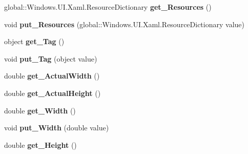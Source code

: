 \begin{DoxyCompactItemize}
global\+::\+Windows.\+U\+I.\+Xaml.\+Resource\+Dictionary {\bfseries get\+\_\+\+Resources} ()
\item 
\mbox{\label{interface_windows_1_1_u_i_1_1_xaml_1_1_i_framework_element_ac37b49cdd76f27a64fdecca76f291b5d}} 
void {\bfseries put\+\_\+\+Resources} (global\+::\+Windows.\+U\+I.\+Xaml.\+Resource\+Dictionary value)
\item 
\mbox{\label{interface_windows_1_1_u_i_1_1_xaml_1_1_i_framework_element_a468d4d76ade5b5e14eccf702af30bbf9}} 
object {\bfseries get\+\_\+\+Tag} ()
\item 
\mbox{\label{interface_windows_1_1_u_i_1_1_xaml_1_1_i_framework_element_a946ec4333d28b5f8c9cca42ce9f9eebc}} 
void {\bfseries put\+\_\+\+Tag} (object value)
\item 
\mbox{\label{interface_windows_1_1_u_i_1_1_xaml_1_1_i_framework_element_a19ecd72cbe177cde31aa3674f563854a}} 
double {\bfseries get\+\_\+\+Actual\+Width} ()
\item 
\mbox{\label{interface_windows_1_1_u_i_1_1_xaml_1_1_i_framework_element_a4501c5030b9e56f51a374091a2fa69f0}} 
double {\bfseries get\+\_\+\+Actual\+Height} ()
\item 
\mbox{\label{interface_windows_1_1_u_i_1_1_xaml_1_1_i_framework_element_a32ae5a6b0dbbc42e55c111d69cf13aa4}} 
double {\bfseries get\+\_\+\+Width} ()
\item 
\mbox{\label{interface_windows_1_1_u_i_1_1_xaml_1_1_i_framework_element_a228ec8feb8d517489e944d64d33ecb60}} 
void {\bfseries put\+\_\+\+Width} (double value)
\item 
\mbox{\label{interface_windows_1_1_u_i_1_1_xaml_1_1_i_framework_element_a23dd911ee7c74e5d1697ba512b6a45d7}} 
double {\bfseries get\+\_\+\+Height} ()
\item 

\end{DoxyCompactItemize}
